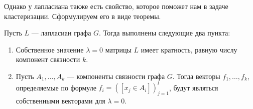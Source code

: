 \documentclass[12pt,fleqn]{article}
\begin{document}
Однако у лапласиана также есть свойство, которое поможет нам в задаче кластеризации. Сформулируем его в виде теоремы.

\begin{vkTheorem} Пусть $L$ --- лапласиан графа $G$. Тогда выполнены следующие два пункта:
\begin{enumerate}
   \item Собственное значение $\lambda = 0$ матрицы $L$ имеет кратность, равную числу компонент связности $k$.
   \item Пусть $A_1, \dots, A_k$ --- компоненты связности графа $G$. Тогда векторы $f_1,\dots, f_k$, определяемые по формуле
   $f_i = \left([x_j\in A_i]\right)_{j=1}^{l}$, будут являться собственными векторами для $\lambda = 0$.
\end{enumerate}
\end{vkTheorem}
\end{document}
